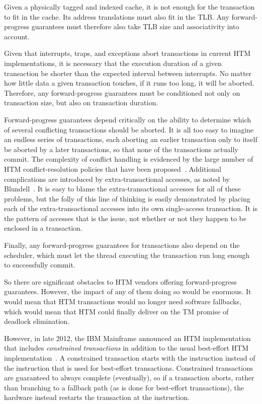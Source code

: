 Given a physically tagged and indexed cache, it is not enough for the
transaction to fit in the cache.
Its address translations must also fit in the TLB.
Any forward-progress guarantees must therefore also take TLB size
and associativity into account.

Given that interrupts, traps, and exceptions abort transactions in current
HTM implementations, it is necessary that the execution duration of
a given transaction be shorter than the expected interval between
interrupts.
No matter how little data a given transaction touches, if it runs too
long, it will be aborted.
Therefore, any forward-progress guarantees must be conditioned not only
on transaction size, but also on transaction duration.

Forward-progress guarantees depend critically on the ability to determine
which of several conflicting transactions should be aborted.
It is all too easy to imagine an endless series of transactions, each
aborting an earlier transaction only to itself be aborted by a later
transactions, so that none of the transactions actually commit.
The complexity of conflict handling is
evidenced by the large number of HTM conflict-resolution policies
that have been proposed~\cite{EgeAkpinar2011HTM2TLE,YujieLiu2011ToxicTransactions}.
Additional complications are introduced by extra-transactional accesses,
as noted by Blundell~\cite{Blundell2006TMdeadlock}.
It is easy to blame the extra-transactional accesses for all of these
problems, but the folly of this line of thinking is easily demonstrated
by placing each of the extra-transactional accesses into its own
single-access transaction.
It is the pattern of accesses that is the issue, not whether or not they
happen to be enclosed in a transaction.

Finally, any forward-progress guarantees for transactions also
depend on the scheduler, which must let the thread executing the
transaction run long enough to successfully commit.

So there are significant obstacles to HTM vendors offering forward-progress
guarantees.
However, the impact of any of them doing so would be enormous.
It would mean that HTM transactions would no longer need software
fallbacks, which would mean that HTM could finally deliver on the
TM promise of deadlock elimination.

However, in late 2012, the IBM Mainframe announced an HTM implementation
that includes \emph{constrained transactions} in addition to the usual
best-effort HTM
implementation~\cite{ChristianJacobi2012MainframeTM}.
A constrained transaction starts with the  instruction
instead of the  instruction that is used for best-effort
transactions.
Constrained transactions are guaranteed to always complete (eventually),
so if a transaction aborts, rather than branching to a fallback path
(as is done for best-effort transactions), the hardware instead restarts
the transaction at the  instruction.

